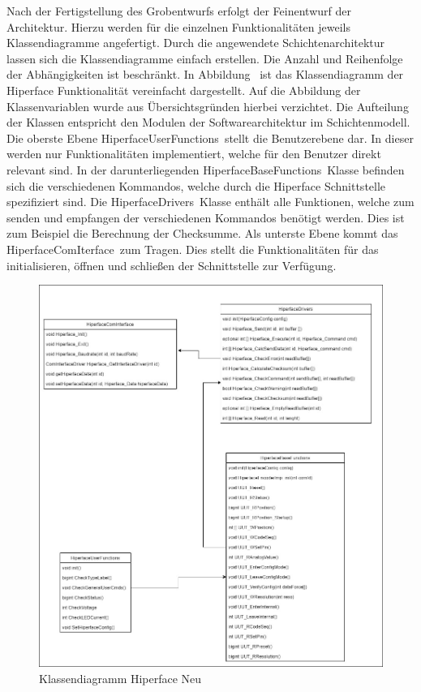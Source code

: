 Nach der Fertigstellung des Grobentwurfs erfolgt der Feinentwurf der Architektur. Hierzu werden für die einzelnen  Funktionalitäten jeweils Klassendiagramme angefertigt. Durch die angewendete Schichtenarchitektur lassen sich die Klassendiagramme einfach erstellen. Die Anzahl und Reihenfolge der Abhängigkeiten ist  beschränkt. In Abbildung \dq {}\dq~ist das Klassendiagramm der Hiperface Funktionalität vereinfacht dargestellt. Auf die Abbildung der Klassenvariablen wurde aus Übersichtsgründen hierbei verzichtet. Die Aufteilung der Klassen entspricht den Modulen der Softwarearchitektur im Schichtenmodell. Die oberste Ebene \dq HiperfaceUserFunctions\dq~stellt die Benutzerebene dar. In dieser werden nur Funktionalitäten implementiert, welche für den Benutzer direkt relevant sind. In der darunterliegenden \dq HiperfaceBaseFunctions\dq~Klasse befinden sich die verschiedenen Kommandos, welche durch die Hiperface Schnittstelle spezifiziert sind. Die \dq HiperfaceDrivers\dq~Klasse enthält alle Funktionen, welche zum senden und  empfangen der verschiedenen Kommandos benötigt werden. Dies ist zum Beispiel die Berechnung der Checksumme. Als unterste Ebene kommt das \dq HiperfaceComIterface\dq~zum Tragen. Dies stellt die Funktionalitäten für das initialisieren, öffnen und schließen der Schnittstelle zur Verfügung.\newline
\begin{figure}[h]
  \centering
   \includegraphics[width=1\textwidth]{img/Klassendiagramm_Hiperface.jpg } 
   \caption{Klassendiagramm Hiperface Neu}
   \label{fig:Klassen_Hiperface.jpg}
\end{figure}

